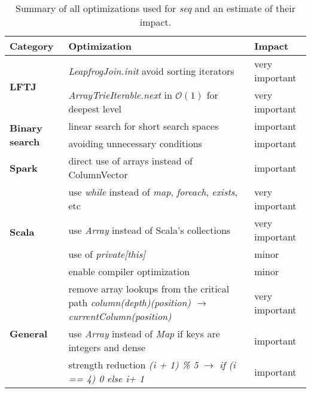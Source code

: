 \begin{table}[]
\begin{tabular}{@{}lp{12cm}l@{}}
\toprule
Category                       & Optimization                                                                           & Impact         \\ \midrule
\multirow{2}{*}{\textbf{LFTJ}} & \textit{LeapfrogJoin.init} avoid sorting iterators                                               & very important \\
& \textit{ArrayTrieIterable.next} in $\mathcal{O} (1)$ for deepest level                               & very important \\
\hline
\multirow{2}{*}{\textbf{Binary search}} & linear search for short search spaces                                                  & important      \\
& avoiding unnecessary conditions                                                        & important      \\
\hline
\textbf{Spark}                  & direct use of arrays instead of ColumnVector                                           & important      \\
\hline
\multirow{4}{*}{\textbf{Scala}}         & use \textit{while} instead of \textit{map}, \textit{foreach}, \textit{exists}, etc     & very important \\
& use \textit{Array} instead of Scala's collections                                      & very important \\
& use of \textit{private{[}this{]}}                                                      & minor          \\
& enable compiler optimization                                                           & minor          \\
\hline
\multirow{3}{*}{\textbf{General}}& remove array lookups from the critical path \textit{column(depth)(position) $\rightarrow$ currentColumn(position)} & very important \\
& use \textit{Array} instead of \textit{Map} if keys are integers and dense              & important      \\

& strength reduction \textit{(i + 1) \% 5} $\rightarrow$ \textit{if (i == 4) 0 else i+ 1}         & important      \\ \bottomrule

\end{tabular}
\caption{Summary of all optimizations used for \textit{seq} and an estimate of their impact. }
\label{table:optimizations-seq}
\end{table}

